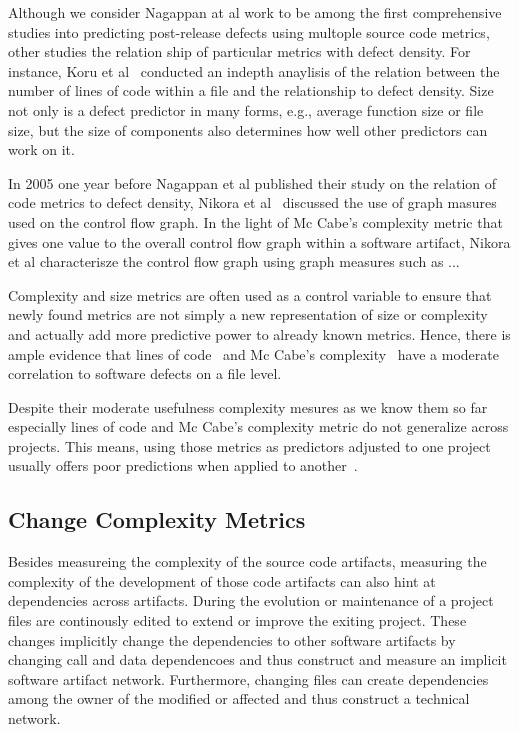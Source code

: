 Although we consider Nagappan at al work to be among the first comprehensive studies into predicting post-release defects using multople source code metrics, other studies the relation ship of particular metrics with defect density.
For instance, Koru et al~\cite{koru:promise:2005} conducted an indepth anaylisis of the relation between the number of lines of code within a file and the relationship to defect density.
Size not only is a defect predictor in many forms, e.g., average function size or file size, but the size of components also determines how well other predictors can work on it.

In 2005 one year before Nagappan et al published their study on the relation of code metrics to defect density, Nikora et al~\cite{nikora:metrics:2005} discussed the use of graph masures used on the control flow graph.
In the light of Mc Cabe's complexity metric that gives one value to the overall control flow graph within a software artifact, Nikora et al characterisze the control flow graph using graph measures such as ...

Complexity and size metrics are often used as a control variable to ensure that newly found metrics are not simply a new representation of size or complexity and actually add more predictive power to already known metrics.
Hence, there is ample evidence that lines of code~\cite{shihab:esem:2010,arisholm:isese:2006,jiang:promise:2008,knab:msr:2006,zhang:icsm:2009} and Mc Cabe's complexity~\cite{nagappan:icse:2006,shihab:fse:2011,zimmermann:fse:2009,jiang:promise:2008,zimmermann:promise:2007} have a moderate correlation to software defects on a file level.

Despite their moderate usefulness complexity mesures as we know them so far especially lines of code and Mc Cabe's complexity metric do not generalize across projects.
This means, using those metrics as predictors adjusted to one project usually offers poor predictions when applied to another~\cite{zimmermann:fse:2009}. 


\subsection{Change Complexity Metrics}
Besides measureing the complexity of the source code artifacts, measuring the complexity of the development of those code artifacts can also hint at dependencies across artifacts.
During the evolution or maintenance of a project files are continously edited to extend or improve the exiting project.
These changes implicitly change the dependencies to other software artifacts by changing call and data dependencoes and thus construct and measure an implicit software artifact network.
Furthermore, changing files can create dependencies among the owner of the modified or affected and thus construct a technical network.

